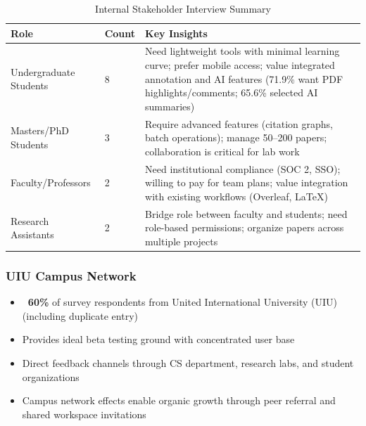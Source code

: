 \begin{table}[H]
    \centering
    \small
    \begin{tabular}{|l|l|p{7cm}|}
        \hline
        \textbf{Role}          & \textbf{Count} & \textbf{Key Insights}                                                                                                                           \\
        \hline
        Undergraduate Students & 8              &
        Need lightweight tools with minimal learning curve; prefer mobile access; value integrated annotation and AI features (71.9\% want PDF highlights/comments; 65.6\% selected AI summaries) \\
        \hline
        Masters/PhD Students   & 3              &
        Require advanced features (citation graphs, batch operations); manage 50--200 papers; collaboration is critical for lab work                                                              \\
        \hline
        Faculty/Professors     & 2              &
        Need institutional compliance (SOC 2, SSO); willing to pay for team plans; value integration with existing workflows (Overleaf, LaTeX)                                                    \\
        \hline
        Research Assistants    & 2              &
        Bridge role between faculty and students; need role-based permissions; organize papers across multiple projects                                                                           \\
        \hline
    \end{tabular}
    \caption{Internal Stakeholder Interview Summary}
    \label{table:internal-stakeholders}
\end{table}

\subsubsection{UIU Campus Network}

\begin{itemize}
    \item \textbf{~60\%} of survey respondents from United International University (UIU) (including duplicate entry)
    \item Provides ideal beta testing ground with concentrated user base
    \item Direct feedback channels through CS department, research labs, and student organizations
    \item Campus network effects enable organic growth through peer referral and shared workspace invitations
\end{itemize}

